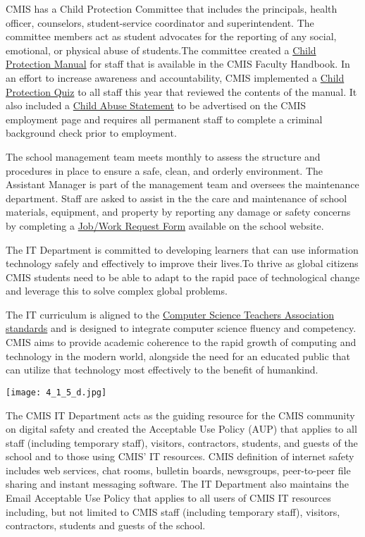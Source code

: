 \begin{findings}
CMIS has a Child Protection Committee that includes the principals, health officer, counselors, student-service coordinator and superintendent. The committee members act as student advocates for the reporting of any social, emotional, or physical abuse of students.The committee created a \href{https://docs.google.com/a/cmis.ac.th/document/d/1NtJ-Yz1ra-dug9r6BmMGqTD3tE9TFxx5W1QhBzPYlxI/edit?usp=sharing}{Child Protection Manual} for staff that is available in the CMIS Faculty Handbook. In an effort to increase awareness and accountability, CMIS implemented a \href{https://docs.google.com/a/cmis.ac.th/forms/d/185Ul5UTdsOSC8btz8CWdIvklNYs6WdPdnzb7gUrOYyM/edit}{Child Protection Quiz} to all staff this year that reviewed the contents of the manual. It also included a \href{http://cmis.ac.th/about/employment}{Child Abuse Statement} to be advertised on the CMIS employment page and requires all permanent staff to complete a criminal background check prior to employment.

The school management team meets monthly to assess the structure and procedures in place to ensure a safe, clean, and orderly environment. The Assistant Manager is part of the management team and oversees the maintenance department. Staff are asked to assist in the the care and maintenance of school materials, equipment, and property by reporting any damage or safety concerns by completing a \href{https://docs.google.com/a/cmis.ac.th/forms/d/e/1FAIpQLSe3YhMowLuZm-HuEG2v_6M2HYfOmQJ5tQG5gB2nEAksooUQNA/viewform}{Job/Work Request Form} available on the school website.

The IT Department is committed to developing learners that can use information technology safely and effectively to improve their lives.To thrive as global citizens CMIS students need to be able to adapt to the rapid pace of technological change and leverage this to solve complex global problems.

The IT curriculum is aligned to the \href{https://www.csteachers.org/}{Computer Science Teachers Association standards} and is designed to integrate computer science fluency and competency. CMIS  aims to provide academic coherence to the rapid growth of computing and technology in the modern world, alongside the need for an educated public that can utilize that technology most effectively to the benefit of humankind.

\texttt{[image: 4\_1\_5\_d.jpg]}

The CMIS IT Department acts as the guiding resource for the CMIS community on digital safety and created the Acceptable Use Policy (AUP) that applies to all staff (including temporary staff), visitors, contractors, students, and guests of the school and to those using CMIS' IT resources.  CMIS definition of internet safety includes web services, chat rooms, bulletin boards, newsgroups, peer-to-peer file sharing and instant messaging software.  The IT Department also maintains the Email Acceptable Use Policy that applies to all users of CMIS IT resources including, but not limited to CMIS staff (including temporary staff), visitors, contractors, students and guests of the school.  


\end{findings}
